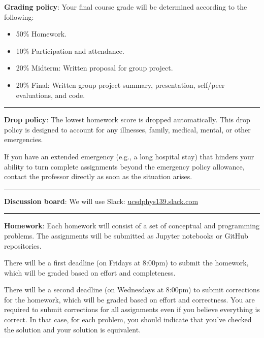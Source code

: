 \documentclass[12pt]{article}
\begin{document}
\noindent\textbf{Grading policy}: Your final course grade will be determined according to the following:
\begin{itemize}
	\itemsep-0.3em
	\item 50\% Homework.
	\item 10\% Participation and attendance.
	\item 20\% Midterm: Written proposal for group project.
	\item 20\% Final: Written group project summary, presentation, self/peer evaluations, and code.
\end{itemize}

\begin{center}
	\rule{\textwidth}{0.5pt}
\end{center}

\noindent\textbf{Drop policy}: The lowest homework score is dropped automatically.
This drop policy is designed to account for any illnesses, family, medical, mental, or other emergencies.

If you have an extended emergency (e.g., a long hospital stay) that hinders your ability to turn complete assignments beyond the emergency policy allowance, contact the professor directly as soon as the situation arises.

\begin{center}
	\rule{\textwidth}{0.5pt}
\end{center}

\noindent\textbf{Discussion board}: We will use Slack: \href{https://join.slack.com/t/ucsdphys139/shared\_invite/zt-110gwd4lx-pZBsItfcxhbOD5BV6afVDA}{ucsdphys139.slack.com}

\begin{center}
	\rule{\textwidth}{0.5pt}
\end{center}

\noindent\textbf{Homework}: Each homework will consist of a set of conceptual and programming problems.
The assignments will be submitted as Jupyter notebooks or GitHub repositories.

There will be a first deadline (on Fridays at 8:00pm) to submit the homework, which will be graded based on effort and completeness.

There will be a second deadline (on Wednesdays at 8:00pm) to submit corrections for the homework, which will be graded based on effort and correctness.
You are required to submit corrections for all assignments even if you believe everything is correct.
In that case, for each problem, you should indicate that you've checked the solution and your solution is equivalent.
\end{document}
